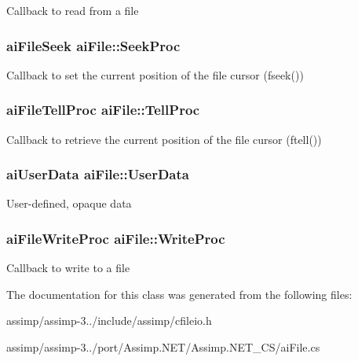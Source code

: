 Callback to read from a file \hypertarget{structai_file_a7a07b499be4ad433669246479a4d4ad2}{
\subsubsection[{Seek\+Proc}]{\setlength{\rightskip}{0pt plus 5cm}ai\+File\+Seek ai\+File\+::\+Seek\+Proc}}\label{structai_file_a7a07b499be4ad433669246479a4d4ad2}
Callback to set the current position of the file cursor (fseek()) \hypertarget{structai_file_aaf2d88a3b2fcbdacf51119658283d27e}{
\subsubsection[{Tell\+Proc}]{\setlength{\rightskip}{0pt plus 5cm}ai\+File\+Tell\+Proc ai\+File\+::\+Tell\+Proc}}\label{structai_file_aaf2d88a3b2fcbdacf51119658283d27e}
Callback to retrieve the current position of the file cursor (ftell()) \hypertarget{structai_file_aec528fa18f4755fe4f28d604fde28aad}{
\subsubsection[{User\+Data}]{\setlength{\rightskip}{0pt plus 5cm}ai\+User\+Data ai\+File\+::\+User\+Data}}\label{structai_file_aec528fa18f4755fe4f28d604fde28aad}
User-\/defined, opaque data \hypertarget{structai_file_ab9fca3a62e34a33592c13a6f31db7d1d}{
\subsubsection[{Write\+Proc}]{\setlength{\rightskip}{0pt plus 5cm}ai\+File\+Write\+Proc ai\+File\+::\+Write\+Proc}}\label{structai_file_ab9fca3a62e34a33592c13a6f31db7d1d}
Callback to write to a file 

The documentation for this class was generated from the following files\+:\begin{DoxyCompactItemize}
\item 
assimp/assimp-\/3../include/assimp/cfileio.\+h\item 
assimp/assimp-\/3../port/\+Assimp.\+N\+E\+T/\+Assimp.\+N\+E\+T\+\_\+\+C\+S/ai\+File.\+cs\end{DoxyCompactItemize}
